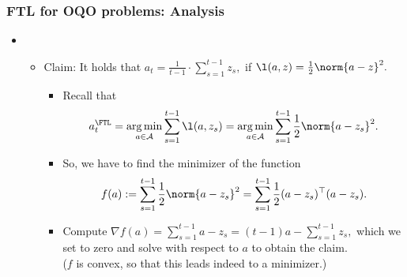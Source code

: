 \documentclass[11pt,compress,t,notes=noshow, xcolor=table]{beamer}
\begin{document}
\begin{frame} 
	\frametitle{FTL for OQO problems: Analysis}
	\small
	\begin{itemize}	
		\item[]
		\begin{itemize}	 \small
				\item Claim: It holds that $a_t = \frac{1}{t - 1} \cdot \sum\nolimits_{s = 1}^{t-1} z_s,$ if $\l(a,z)=\frac12\norm{a-z}^2 .$ 
				\pause	
				\begin{itemize} \small
						 \item	Recall that $$a_t^{\FTL} = \argmin_{a \in \mathcal{A}} \sum_{s=1}^{t-1} \l(a,z_s)  = \argmin_{a \in \mathcal{A}} \sum_{s=1}^{t-1} \frac12 \norm{a - z_s}^2. $$
						\pause				
						 \item So, we have to find the minimizer of the function $$f(a):= \sum_{s=1}^{t-1} \frac12 \norm{a - z_s}^2  =   \sum_{s=1}^{t-1} \frac12 (a - z_s)^\top (a-z_s).$$
						\pause				
						 \item Compute  $\nabla f(a) = \sum_{s=1}^{t-1}  a  - z_s =  (t-1) a  - \sum_{s=1}^{t-1} z_s,$ which we set to zero and solve with respect to $a$ to obtain the claim.\\
						{\tiny ($f$ is convex, so that this leads indeed to a minimizer.)}
					\end{itemize} 
			\end{itemize}
	\end{itemize}
\end{frame}
%
%
\end{document}

